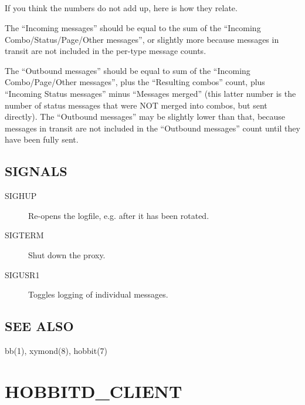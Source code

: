 \subsection{}
 If you think the numbers do not add up, here is how they relate. 

  The ``Incoming messages'' should be equal to the sum of the ``Incoming Combo/Status/Page/Other messages'', or slightly more because messages in transit are not included in the per-type message counts. 


  The ``Outbound messages'' should be equal to sum of the ``Incoming Combo/Page/Other messages'', plus the ``Resulting combos'' count, plus ``Incoming Status messages'' minus ``Messages merged'' (this latter number is the number of status messages that were NOT merged into combos, but sent directly). The ``Outbound messages'' may be slightly lower than that, because messages in transit are not included in the ``Outbound messages'' count until they have been fully sent. 


 
\subsection{SIGNALS}
\begin{description}
\item[SIGHUP] Re-opens the logfile, e.g. after it has been rotated. 

 

\item[SIGTERM] Shut down the proxy. 

 

\item[SIGUSR1] Toggles logging of individual messages. 

 


\end{description}
\subsection{SEE ALSO}
bb(1), xymond(8), hobbit(7) 



%
\newpage
\section{HOBBITD\_CLIENT}

